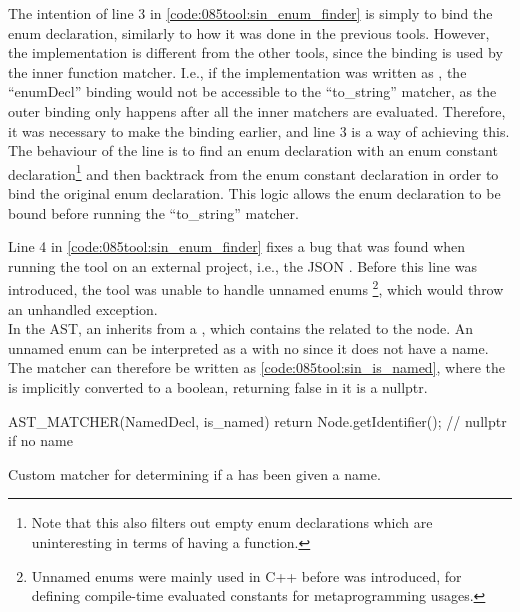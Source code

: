 The intention of line 3 in \cref{code:085tool:sin_enum_finder} is simply to bind the enum declaration, similarly to how it was done in the previous tools.
However, the implementation is different from the other tools, since the binding is used by the inner  function matcher.
I.e., if the implementation was written as , the ``enumDecl'' binding would not be accessible to the ``to\_string'' matcher, as the outer binding only happens after all the inner matchers are evaluated.
Therefore, it was necessary to make the binding earlier, and line 3 is a way of achieving this.\\
The behaviour of the line is to find an enum declaration with an enum constant declaration\footnote{
    Note that this also filters out empty enum declarations which are uninteresting in terms of having a  function.
} and then backtrack from the enum constant declaration in order to bind the original enum declaration. This logic allows the enum declaration to be bound before running the ``to\_string'' matcher.

Line 4 in \cref{code:085tool:sin_enum_finder} fixes a bug that was found when running the tool on an external project, i.e., the JSON \cite{lohmannJSONModern2022}.
Before this line was introduced, the tool was unable to handle unnamed enums
\footnote{
    Unnamed enums were mainly used in C++ before  was introduced, for defining compile-time evaluated constants for metaprogramming usages.
}, which would throw an unhandled exception.\\
In the AST, an  inherits from a , which contains the  related to the node.
An unnamed enum can be interpreted as a  with no  since it does not have a name.
The matcher can therefore be written as \cref{code:085tool:sin_is_named}, where the  is implicitly converted to a boolean, returning false in it is a nullptr.

\begin{listing}[H]
    \begin{cppcode}
AST_MATCHER(NamedDecl, is_named) {
	return Node.getIdentifier(); // nullptr if no name
}
    \end{cppcode}
    \caption{Custom matcher for determining if a  has been given a name.}
    \label{code:085tool:sin_is_named}
\end{listing}

